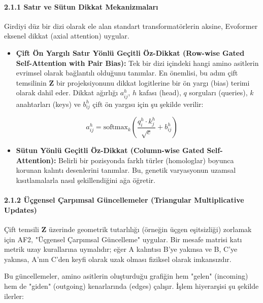 \documentclass[11pt,a4paper]{article}
\begin{document}
\paragraph{2.1.1 Satır ve Sütun Dikkat Mekanizmaları}
Girdiyi düz bir dizi olarak ele alan standart transformatörlerin aksine, Evoformer eksenel dikkat (axial attention) uygular.

\begin{itemize}
  \item \textbf{Çift Ön Yargılı Satır Yönlü Geçitli Öz-Dikkat (Row-wise Gated Self-Attention with Pair Bias):} Tek bir dizi içindeki hangi amino asitlerin evrimsel olarak bağlantılı olduğunu tanımlar. En önemlisi, bu adım çift temsilinin \(\mathbf{Z}\) bir projeksiyonunu dikkat logitlerine bir ön yargı (bias) terimi olarak dahil eder. Dikkat ağırlığı \(a_{ij}^h\), \(h\) kafası (head), \(q\) sorguları (queries), \(k\) anahtarları (keys) ve \(b_{ij}^h\) çift ön yargısı için şu şekilde verilir:
\end{itemize}
\[
a_{ij}^h = \text{softmax}_k \left( \frac{q_i^h \cdot k_j^h}{\sqrt{c}} + b_{ij}^h \right)
\]
\begin{itemize}
  \item \textbf{Sütun Yönlü Geçitli Öz-Dikkat (Column-wise Gated Self-Attention):} Belirli bir pozisyonda farklı türler (homologlar) boyunca korunan kalıntı desenlerini tanımlar. Bu, genetik varyasyonun uzamsal kısıtlamalarla nasıl şekillendiğini ağa öğretir.
\end{itemize}
\paragraph{2.1.2 Üçgensel Çarpımsal Güncellemeler (Triangular Multiplicative Updates)}
Çift temsili \(\mathbf{Z}\) üzerinde geometrik tutarlılığı (örneğin üçgen eşitsizliği) zorlamak için AF2, "Üçgensel Çarpımsal Güncelleme" uygular. Bir mesafe matrisi katı metrik uzay kurallarına uymalıdır; eğer A kalıntısı B'ye yakınsa ve B, C'ye yakınsa, A'nın C'den keyfi olarak uzak olması fiziksel olarak imkansızdır.

Bu güncellemeler, amino asitlerin oluşturduğu grafiğin hem "gelen" (incoming) hem de "giden" (outgoing) kenarlarında (edges) çalışır. İşlem hiyerarşisi şu şekilde ilerler:
\end{document}
